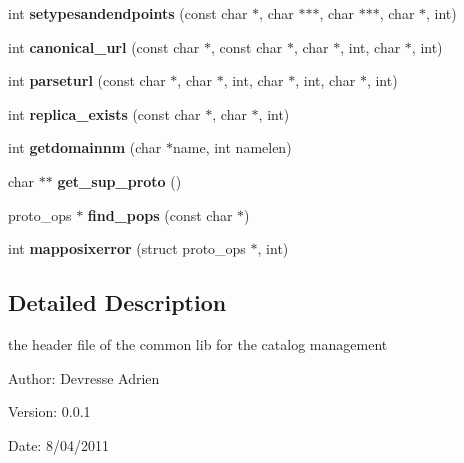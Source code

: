 \begin{CompactItemize}
\item 
int \textbf{setypesandendpoints} (const char $\ast$, char $\ast$$\ast$$\ast$, char $\ast$$\ast$$\ast$, char $\ast$, int)\label{gfal__common__catalog_8h_f06de10d100ffd8ad880619661708810}

\item 
int \textbf{canonical\_\-url} (const char $\ast$, const char $\ast$, char $\ast$, int, char $\ast$, int)\label{gfal__common__catalog_8h_845c890f2d493921bd587158fab72d65}

\item 
int \textbf{parseturl} (const char $\ast$, char $\ast$, int, char $\ast$, int, char $\ast$, int)\label{gfal__common__catalog_8h_70868bce152313f31e24982453f10723}

\item 
int \textbf{replica\_\-exists} (const char $\ast$, char $\ast$, int)\label{gfal__common__catalog_8h_ac34379d44fb4037af134b34a9aae030}

\item 
int \textbf{getdomainnm} (char $\ast$name, int namelen)\label{gfal__common__catalog_8h_446a829e4f333d3a0364ab0f2b5a2dc7}

\item 
char $\ast$$\ast$ \textbf{get\_\-sup\_\-proto} ()\label{gfal__common__catalog_8h_03347619db3b30ef54ae6a98e351e21f}

\item 
proto\_\-ops $\ast$ \textbf{find\_\-pops} (const char $\ast$)\label{gfal__common__catalog_8h_40d4c392e45e16062bc90caf0ebfa436}

\item 
int \textbf{mapposixerror} (struct proto\_\-ops $\ast$, int)\label{gfal__common__catalog_8h_c8360922877ec368815d412209e862a2}

\end{CompactItemize}


\subsection{Detailed Description}
the header file of the common lib for the catalog management 

\begin{Desc}
\item[Author:]Devresse Adrien \end{Desc}
\begin{Desc}
\item[Version:]0.0.1 \end{Desc}
\begin{Desc}
\item[Date:]8/04/2011 \end{Desc}


